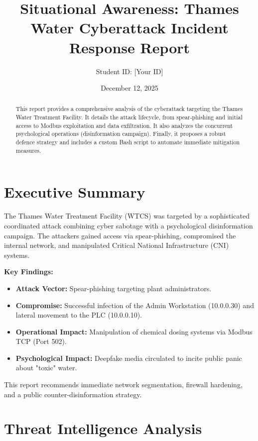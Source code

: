 \documentclass[12pt,a4paper]{article}
\title{\textbf{Situational Awareness: Thames Water Cyberattack Incident Response Report}}
\author{Student ID: [Your ID]}
\date{December 12, 2025}
\begin{document}
\maketitle
\thispagestyle{empty}

\begin{abstract}
This report provides a comprehensive analysis of the cyberattack targeting the Thames Water Treatment Facility. It details the attack lifecycle, from spear-phishing and initial access to Modbus exploitation and data exfiltration. It also analyzes the concurrent psychological operations (disinformation campaign). Finally, it proposes a robust defence strategy and includes a custom Bash script to automate immediate mitigation measures.
\end{abstract}

\newpage
\tableofcontents
\newpage

\section{Executive Summary}
The Thames Water Treatment Facility (WTCS) was targeted by a sophisticated coordinated attack combining cyber sabotage with a psychological disinformation campaign. The attackers gained access via spear-phishing, compromised the internal network, and manipulated Critical National Infrastructure (CNI) systems.

\textbf{Key Findings:}
\begin{itemize}
    \item \textbf{Attack Vector:} Spear-phishing targeting plant administrators.
    \item \textbf{Compromise:} Successful infection of the Admin Workstation (10.0.0.30) and lateral movement to the PLC (10.0.0.10).
    \item \textbf{Operational Impact:} Manipulation of chemical dosing systems via Modbus TCP (Port 502).
    \item \textbf{Psychological Impact:} Deepfake media circulated to incite public panic about "toxic" water.
\end{itemize}

This report recommends immediate network segmentation, firewall hardening, and a public counter-disinformation strategy.

\section{Threat Intelligence Analysis}
\end{document}
